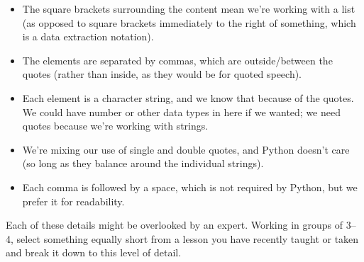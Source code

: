 \begin{itemize}
\item
  The square brackets surrounding the content mean we're working with
  a list (as opposed to square brackets immediately to the right of
  something, which is a data extraction notation).
\item
  The elements are separated by commas, which are outside/between the
  quotes (rather than inside, as they would be for quoted speech).
\item
  Each element is a character string, and we know that because of the
  quotes. We could have number or other data types in here if we
  wanted; we need quotes because we're working with strings.
\item
  We're mixing our use of single and double quotes, and Python doesn't
  care (so long as they balance around the individual strings).
\item
  Each comma is followed by a space, which is not required by Python,
  but we prefer it for readability.
\end{itemize}

Each of these details might be overlooked by an expert. Working in
groups of 3--4, select something equally short from a lesson you have
recently taught or taken and break it down to this level of detail.
